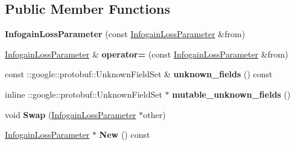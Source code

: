 \subsection*{Public Member Functions}
\begin{DoxyCompactItemize}
\item 
\mbox{\label{classcaffe_1_1_infogain_loss_parameter_aa2d3bbda08f3993b6e1aabef8a043544}} 
{\bfseries Infogain\+Loss\+Parameter} (const \mbox{\hyperlink{classcaffe_1_1_infogain_loss_parameter}{Infogain\+Loss\+Parameter}} \&from)
\item 
\mbox{\label{classcaffe_1_1_infogain_loss_parameter_ac56f1542914d110ad8794d3c765029fb}} 
\mbox{\hyperlink{classcaffe_1_1_infogain_loss_parameter}{Infogain\+Loss\+Parameter}} \& {\bfseries operator=} (const \mbox{\hyperlink{classcaffe_1_1_infogain_loss_parameter}{Infogain\+Loss\+Parameter}} \&from)
\item 
\mbox{\label{classcaffe_1_1_infogain_loss_parameter_acf3b154c5250fec8e5df04e22ee25439}} 
const \+::google\+::protobuf\+::\+Unknown\+Field\+Set \& {\bfseries unknown\+\_\+fields} () const
\item 
\mbox{\label{classcaffe_1_1_infogain_loss_parameter_abdf5838ba83e2a4919b16318496589f6}} 
inline \+::google\+::protobuf\+::\+Unknown\+Field\+Set $\ast$ {\bfseries mutable\+\_\+unknown\+\_\+fields} ()
\item 
\mbox{\label{classcaffe_1_1_infogain_loss_parameter_a475c0894bd54f9adef9d7b07f949b254}} 
void {\bfseries Swap} (\mbox{\hyperlink{classcaffe_1_1_infogain_loss_parameter}{Infogain\+Loss\+Parameter}} $\ast$other)
\item 
\mbox{\label{classcaffe_1_1_infogain_loss_parameter_a94ceed080dcecae2943a7afd27d19450}} 
\mbox{\hyperlink{classcaffe_1_1_infogain_loss_parameter}{Infogain\+Loss\+Parameter}} $\ast$ {\bfseries New} () const
\item 
\mbox{\label{classcaffe_1_1_infogain_loss_parameter_ac49e2517ebff3c2aa70da0c55a29ef4d}} 

\end{DoxyCompactItemize}
